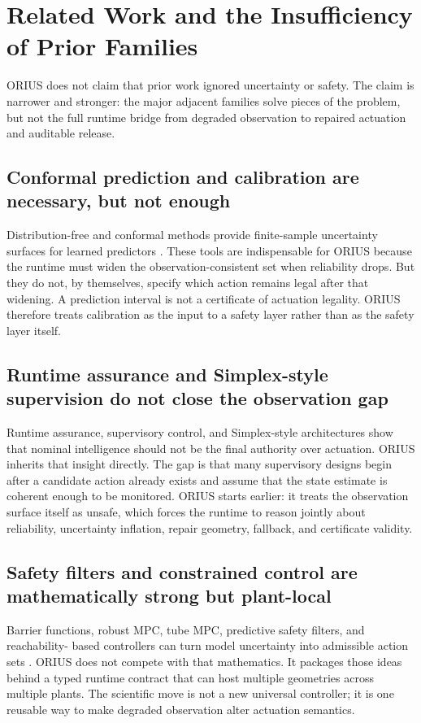 \section{Related Work and the Insufficiency of Prior Families}
\label{sec:prof-related-work}

ORIUS does not claim that prior work ignored uncertainty or safety. The claim is
narrower and stronger: the major adjacent families solve pieces of the problem, but not
the full runtime bridge from degraded observation to repaired actuation and auditable
release.

\subsection{Conformal prediction and calibration are necessary, but not enough}
Distribution-free and conformal methods provide finite-sample uncertainty surfaces for
learned predictors \cite{vovk2005algorithmic,lei2018distribution,romano2019conformalized,gibbs2021adaptive,zaffran2022adaptive,angelopoulos2023gentle,barber2023beyond}.
These tools are indispensable for ORIUS because the runtime must widen the
observation-consistent set when reliability drops. But they do not, by themselves,
specify which action remains legal after that widening. A prediction interval is not a
certificate of actuation legality. ORIUS therefore treats calibration as the input to a
safety layer rather than as the safety layer itself.

\subsection{Runtime assurance and Simplex-style supervision do not close the observation gap}
Runtime assurance, supervisory control, and Simplex-style architectures
\cite{sha1998simplex,sha2001using,desai2019soter,bloem2015shield,bartocci2018introduction,leucker2009brief,havelund2004runtime}
show that nominal intelligence should not be the final authority over actuation. ORIUS
inherits that insight directly. The gap is that many supervisory designs begin after a
candidate action already exists and assume that the state estimate is coherent enough to
be monitored. ORIUS starts earlier: it treats the observation surface itself as unsafe,
which forces the runtime to reason jointly about reliability, uncertainty inflation,
repair geometry, fallback, and certificate validity.

\subsection{Safety filters and constrained control are mathematically strong but plant-local}
Barrier functions, robust MPC, tube MPC, predictive safety filters, and reachability-
based controllers can turn model uncertainty into admissible action sets
\cite{ames2014cbf,ames2019control,wabersich2021predictive,fisac2019general,mayne2005robust,langson2004tubes,camacho2013model,rawlings2017mpc}.
ORIUS does not compete with that mathematics. It packages those ideas behind a typed
runtime contract that can host multiple geometries across multiple plants. The
scientific move is not a new universal controller; it is one reusable way to make
degraded observation alter actuation semantics.

